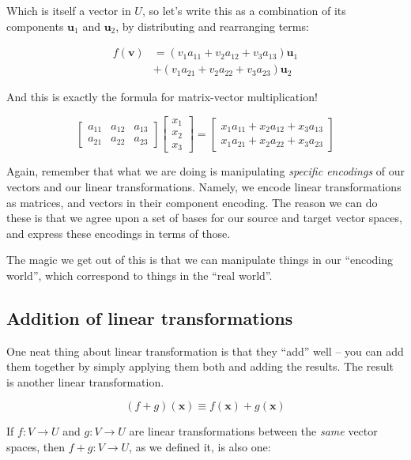 \documentclass[]{article}
\begin{document}
Which is itself a vector in \(U\), so let's write this as a combination of its
components \(\mathbf{u}_1\) and \(\mathbf{u}_2\), by distributing and
rearranging terms:

\[
\begin{aligned}
f(\mathbf{v}) & = (v_1 a_{11} + v_2 a_{12} + v_3 a_{13}) \mathbf{u}_1 \\
              & + (v_1 a_{21} + v_2 a_{22} + v_3 a_{23}) \mathbf{u}_2
\end{aligned}
\]

And this is exactly the formula for matrix-vector multiplication!

\[
\begin{bmatrix}
a_{11} & a_{12} & a_{13} \\
a_{21} & a_{22} & a_{23}
\end{bmatrix}
\begin{bmatrix}
x_1 \\
x_2 \\
x_3
\end{bmatrix}
=
\begin{bmatrix}
x_1 a_{11} + x_2 a_{12} + x_3 a_{13} \\
x_1 a_{21} + x_2 a_{22} + x_3 a_{23}
\end{bmatrix}
\]

Again, remember that what we are doing is manipulating \emph{specific encodings}
of our vectors and our linear transformations. Namely, we encode linear
transformations as matrices, and vectors in their component encoding. The reason
we can do these is that we agree upon a set of bases for our source and target
vector spaces, and express these encodings in terms of those.

The magic we get out of this is that we can manipulate things in our ``encoding
world'', which correspond to things in the ``real world''.

\subsection{Addition of linear
transformations}\label{addition-of-linear-transformations}

One neat thing about linear transformation is that they ``add'' well -- you can
add them together by simply applying them both and adding the results. The
result is another linear transformation.

\[
(f + g)(\mathbf{x}) \equiv f(\mathbf{x}) + g(\mathbf{x})
\]

If \(f : V \rightarrow U\) and \(g : V \rightarrow U\) are linear
transformations between the \emph{same} vector spaces, then
\(f + g : V \rightarrow U\), as we defined it, is also one:
\end{document}
